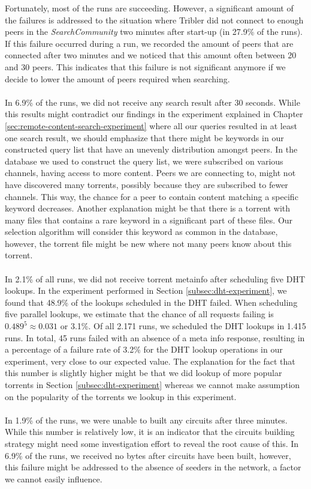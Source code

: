 Fortunately, most of the runs are succeeding. However, a significant amount of the failures is addressed to the situation where Tribler did not connect to enough peers in the \emph{SearchCommunity} two minutes after start-up (in 27.9\% of the runs). If this failure occurred during a run, we recorded the amount of peers that are connected after two minutes and we noticed that this amount often between 20 and 30 peers. This indicates that this failure is not significant anymore if we decide to lower the amount of peers required when searching.\\\\
In 6.9\% of the runs, we did not receive any search result after 30 seconds. While this results might contradict our findings in the experiment explained in Chapter \ref{sec:remote-content-search-experiment} where all our queries resulted in at least one search result, we should emphasize that there might be keywords in our constructed query list that have an unevenly distribution amongst peers. In the database we used to construct the query list, we were subscribed on various channels, having access to more content. Peers we are connecting to, might not have discovered many torrents, possibly because they are subscribed to fewer channels. This way, the chance for a peer to contain content matching a specific keyword decreases. Another explanation might be that there is a torrent with many files that contains a rare keyword in a significant part of these files. Our selection algorithm will consider this keyword as common in the database, however, the torrent file might be new where not many peers know about this torrent.\\\\
In 2.1\% of all runs, we did not receive torrent metainfo after scheduling five DHT lookups. In the experiment performed in Section \ref{subsec:dht-experiment}, we found that 48.9\% of the lookups scheduled in the DHT failed. When scheduling five parallel lookups, we estimate that the chance of all requests failing is $ 0.489^5 \approx 0.031 $ or 3.1\%. Of all 2.171 runs, we scheduled the DHT lookups in 1.415 runs. In total, 45 runs failed with an absence of a meta info response, resulting in a percentage of a failure rate of 3.2\% for the DHT lookup operations in our experiment, very close to our expected value. The explanation for the fact that this number is slightly higher might be that we did lookup of more popular torrents in Section \ref{subsec:dht-experiment} whereas we cannot make assumption on the popularity of the torrents we lookup in this experiment.\\\\
In 1.9\% of the runs, we were unable to built any circuits after three minutes. While this number is relatively low, it is an indicator that the circuits building strategy might need some investigation effort to reveal the root cause of this. In 6.9\% of the runs, we received no bytes after circuits have been built, however, this failure might be addressed to the absence of seeders in the network, a factor we cannot easily influence.

